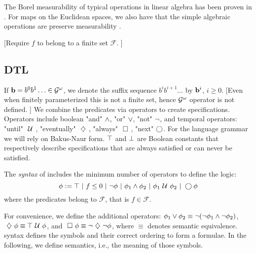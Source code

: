 \documentclass[conference]{IEEEtran}
\newcommand{\red}[1]{{\color{red} #1}}
\newcommand{\Fpred}{{\mathcal F}}
\begin{document}
    The Borel measurability of typical operations in linear algebra 
   has been proven in \cite{azoff1974borel}.
For maps on the Euclidean spaces, we also have that the simple algebraic operations are preserve measurability \cite[page 116]{lang1993real}.

\red{[Require $f$ to belong to a finite set $\Fpred$. ]}
  
    \subsection{DTL}    
    If $\mathbf{b} = b^0b^1 \ldots \in \mathcal{G}^{\omega}$,
    we denote the suffix sequence $b^i b^{i+1} \ldots$ by
    $\mathbf{b}^i$, $i \geq 0$.  \red{[Even when finitely parameterized this is not a finite set, hence $\mathcal{G}^{\omega}$ operator is not defined. ]}
   We  combine the predicates via operators to create specifications. Operators include boolean "and" $\wedge$, "or" $\vee$, "not" $\neg$, and temporal operators: "until" $\ \mathcal{U}\ $, "eventually" $\ \diamondsuit\ $, "always" $\ \square\ $, "next" $\bigcirc$.
      For the language grammar we will rely on Bakus-Naur form. $\top$ and $\perp$ are Boolean constants that respectively describe specifications that are always satisfied or can never be satisfied.
    
    \begin{definition}
    \label{def:gdtl-syntax}
    The {\em syntax} of \DTL includes the minimum number of operators to define the logic:
    \begin{equation*}
     \phi :=  \top \ |\ f \leq 0 \ |\ \neg \phi \ |\ \phi_1 \wedge \phi_2 \ |\ \phi_1 \ \mathcal{U}\  \phi_2 \ |\ \bigcirc \phi
    \end{equation*} where the predicates belong to $\Fpred$, that is $f \in \Fpred$. 
    \end{definition}

    For convenience, we define the additional operators:
    $\phi_1 \vee \phi_2 \equiv  \neg (\neg \phi_1 \wedge \neg \phi_2)$,
    $\ \diamondsuit\  \phi \equiv \top \ \mathcal{U}\  \phi$, and
    $\ \square\  \phi \equiv \neg \ \diamondsuit\  \neg \phi$,
    where $\equiv$ denotes semantic equivalence. \DTL syntax defines the symbols and their correct ordering to form a formulae. In the following, we define \DTL semantics, i.e., the meaning of those symbols.
\end{document}
